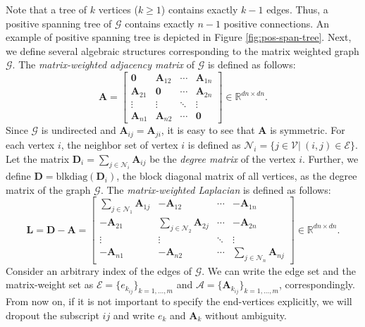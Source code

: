 \documentclass[draftclsnofoot,11pt,onecolumn]{IEEEtran}
\newcommand{\m}[1]{\mathbf{#1}}
\newcommand{\mc}[1]{\mathcal{#1}}
\newcommand{\mb}[1]{\mathbb{#1}}
\begin{document}
Note that a tree of $k$ vertices ($k \geq 1$) contains exactly $k-1$ edges. Thus, a positive spanning tree of $\mc{G}$ contains exactly $n-1$ positive connections. An example of positive spanning tree is depicted in Figure \ref{fig:pos-span-tree}. Next, we define several algebraic structures corresponding to the matrix weighted graph $\mc{G}$.
The \emph{matrix-weighted adjacency matrix} of $\mc{G}$ is defined as follows:
\begin{equation}\label{eq:adjacency_matrix}
\m{A} = \begin{bmatrix}
\m{0}&\m{A}_{12}& \cdots &\m{A}_{1n}\\
{{\m{A}_{21}}}&\m{0}& \cdots &\m{A}_{2n}\\
 \vdots & \vdots & \ddots & \vdots \\
{{\m{A}_{n1}}}&{{\m{A}_{n2}}}& \cdots &{{\m{0}}}
\end{bmatrix} \in \mb{R}^{dn \times dn}.
\end{equation}
Since $\mc{G}$ is undirected and $\m{A}_{ij} = \m{A}_{ji}$, it is easy to see that $\m{A}$ is symmetric. For each vertex $i$, the neighbor set of vertex $i$ is defined as $\mc{N}_i = \{ j \in \mc{V}|~(i,j) \in \mc{E} \}$. Let the matrix $\m{D}_i = \sum_{j\in \mc{N}_i} \m{A}_{ij}$ be the \emph{degree matrix} of the vertex $i$. Further, we define $\m{D} = \text{blkdiag}(\m{D}_i)$, the block diagonal matrix of all vertices, as the degree matrix of the graph $\mc{G}$. The \emph{matrix-weighted Laplacian} is defined as follows:
\begin{equation*} %
\m{L} = \m{D} - \m{A} = \begin{bmatrix}
\sum\limits_{j \in \mc{N}_1} \m{A}_{1j}&-\m{A}_{12}& \cdots &-\m{A}_{1n}\\
-{{\m{A}_{21}}}&\sum\limits_{j\in \mc{N}_2} \m{A}_{2j}& \cdots &-\m{A}_{2n}\\
 \vdots & \vdots & \ddots & \vdots \\
-{{\m{A}_{n1}}}&-{{\m{A}_{n2}}}& \cdots &\sum\limits_{j\in \mc{N}_n} \m{A}_{nj}
\end{bmatrix} \in \mb{R}^{dn \times dn}.
\end{equation*}
Consider an arbitrary index of the edges of $\mc{G}$. We can write the edge set and the matrix-weight set as $\mc{E} = \{{e}_{k_{ij}}\}_{k = 1, \ldots, m}$ and $\mc{A} = \{\m{A}_{k_{ij}}\}_{k = 1, \ldots, m}$, correspondingly. From now on, if it is not important to specify the end-vertices explicitly, we will dropout the subscript $ij$ and write $e_k$ and $\m{A}_k$ without ambiguity. 
\end{document}
